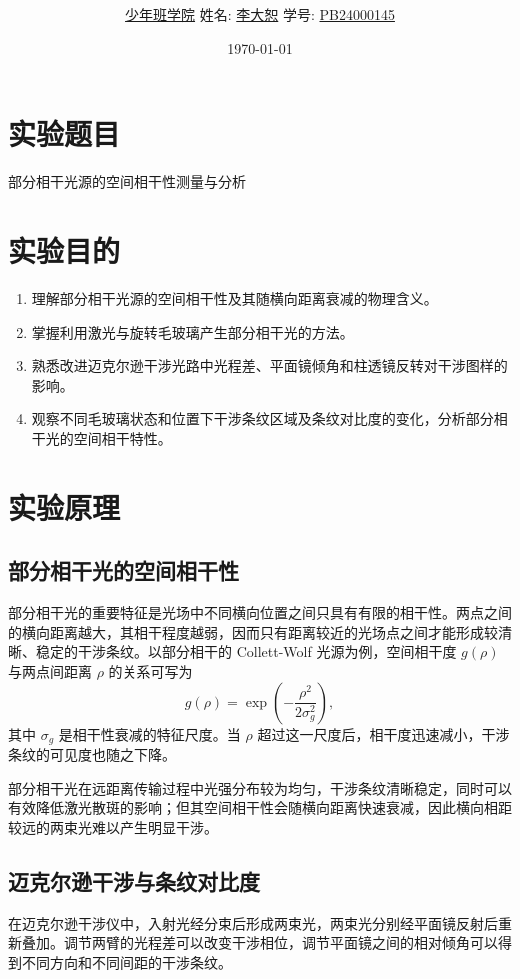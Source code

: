 \documentclass[12pt,a4paper]{article}
\title{\Huge{\textbf{\uuline{预\ 习\ 报\ 告}}}}
\author{\uline{少年班学院} \quad 姓名: \uline{李大恕} \quad 学号: \uline{PB24000145}}
\date{\today}
\begin{document}
\maketitle

\section{实验题目}
部分相干光源的空间相干性测量与分析

\section{实验目的}
\begin{enumerate}
    \item 理解部分相干光源的空间相干性及其随横向距离衰减的物理含义。
    \item 掌握利用激光与旋转毛玻璃产生部分相干光的方法。
    \item 熟悉改进迈克尔逊干涉光路中光程差、平面镜倾角和柱透镜反转对干涉图样的影响。
    \item 观察不同毛玻璃状态和位置下干涉条纹区域及条纹对比度的变化，分析部分相干光的空间相干特性。
\end{enumerate}

\section{实验原理}
\subsection{部分相干光的空间相干性}
部分相干光的重要特征是光场中不同横向位置之间只具有有限的相干性。两点之间的横向距离越大，其相干程度越弱，因而只有距离较近的光场点之间才能形成较清晰、稳定的干涉条纹。以部分相干的 Collett-Wolf 光源为例，空间相干度 $g(\rho)$ 与两点间距离 $\rho$ 的关系可写为
\begin{equation}
    g(\rho)=\exp\left(-\frac{\rho^2}{2\sigma_g^2}\right),
    \label{eq:coherence}
\end{equation}
其中 $\sigma_g$ 是相干性衰减的特征尺度。当 $\rho$ 超过这一尺度后，相干度迅速减小，干涉条纹的可见度也随之下降。

部分相干光在远距离传输过程中光强分布较为均匀，干涉条纹清晰稳定，同时可以有效降低激光散斑的影响；但其空间相干性会随横向距离快速衰减，因此横向相距较远的两束光难以产生明显干涉。

\subsection{迈克尔逊干涉与条纹对比度}
在迈克尔逊干涉仪中，入射光经分束后形成两束光，两束光分别经平面镜反射后重新叠加。调节两臂的光程差可以改变干涉相位，调节平面镜之间的相对倾角可以得到不同方向和不同间距的干涉条纹。
\end{document}
